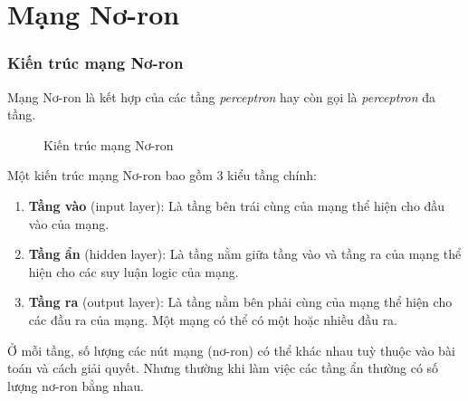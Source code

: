\section{Mạng Nơ-ron}
    \subsubsection{Kiến trúc mạng Nơ-ron}
    Mạng Nơ-ron là kết hợp của các tầng \emph{perceptron} hay còn gọi là \emph{perceptron} đa tầng. 
    \begin{figure}[ht]
        \centering
        \caption{Kiến trúc mạng Nơ-ron}
        \label{fig:problem:neural-architect}
    \end{figure}
    Một kiến trúc mạng Nơ-ron bao gồm 3 kiểu tầng chính:
    \begin{enumerate}
        \item \textbf{Tầng vào} (input layer): Là tầng bên trái cùng của mạng thể hiện cho đầu vào của mạng.
        \item \textbf{Tầng ẩn} (hidden layer): Là tầng nằm giữa tầng vào và tầng ra của mạng thể hiện cho các suy luận logic của mạng.
        \item \textbf{Tầng ra} (output layer): Là tầng nằm bên phải cùng của mạng thể hiện cho các đầu ra của mạng. Một mạng có thể có một hoặc nhiều đầu ra.
    \end{enumerate}
    Ở mỗi tầng, số lượng các nút mạng (nơ-ron) có thể khác nhau tuỳ thuộc vào bài toán và cách giải quyết. Nhưng thường khi làm việc các tầng ẩn thường có số lượng nơ-ron bằng nhau. 

